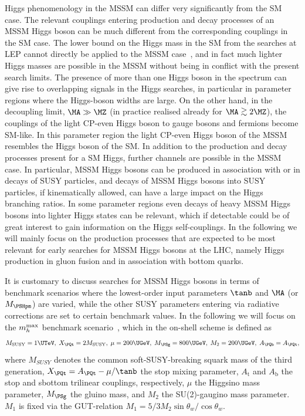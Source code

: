Higgs phenomenology in the MSSM can differ very significantly from the
SM case. The relevant couplings entering production and decay processes
of an MSSM Higgs boson can be much different from the corresponding
couplings in the SM case. The lower bound on the Higgs mass in the SM
from the searches at LEP cannot directly be applied to the MSSM
case~\cite{Barate:2003sz,Schael:2006cr}, and in fact much lighter Higgs 
masses are possible in the MSSM without being in conflict with the
present search limits. The presence of more than one Higgs boson in the
spectrum can give rise to overlapping signals in the Higgs searches, in 
particular in parameter regions where the Higgs-boson widths are large.
On the other hand, 
in the decoupling limit, $\MA \gg \MZ$ (in practice realised already for 
$\MA \gsim 2 \MZ$), the couplings of the light CP-even Higgs boson 
to gauge bosons and fermions become SM-like. In this parameter region 
the light CP-even Higgs boson of the MSSM resembles the 
Higgs boson of the SM. In addition to the production and decay processes 
present for a SM Higgs, further channels are possible in the MSSM case. 
In particular, MSSM Higgs bosons can be produced in association with or
in decays of SUSY particles, and decays of MSSM Higgs bosons into SUSY
particles, if kinematically allowed, can have a large impact on 
the Higgs branching ratios. In some parameter regions even decays of 
heavy MSSM Higgs bosons into lighter Higgs states can be relevant, 
which if detectable could be of great interest to gain information on 
the Higgs self-couplings. In the following we will mainly focus on the 
production processes that are expected to be most relevant for early
searches for MSSM Higgs bosons at the LHC, namely Higgs production in
gluon fusion and in association with bottom quarks.

It is customary to discuss searches for MSSM Higgs bosons in terms of 
benchmark scenarios where the lowest-order input parameters 
$\tanb$ and $\MA$ (or $\MHp$) are varied, while the other SUSY parameters
entering via radiative corrections are set to certain benchmark values. 
In the following we will focus on the $m_h^{\rm max}$ benchmark 
scenario~\cite{Carena:2002qg}, which in the on-shell scheme is defined as
\begin{equation}
M_{\mathrm{SUSY}} = 1 \UTeV, \; X_{\PQt} = 2 M_{\mathrm{SUSY}}, \; \mu = 200 \UGeV, \;
M_{\PSg}=800 \UGeV, \; M_2 = 200 \UGeV, \; A_{\PQb} = A_{\PQt},
\label{YRHXS_MSSM_neutral_eq:mhmax}
\end{equation}
where $M_{SUSY}$ denotes the common soft-SUSY-breaking squark mass of
the third generation, $X_{\PQt}=A_{\PQt}-\mu/\tanb$ the stop mixing
parameter, $A_\mathrm{t}$ and $A_\mathrm{b}$ the stop and sbottom
trilinear couplings, respectively, $\mu$ the Higgsino mass parameter,
$M_{\PSg}$ the gluino mass, and $M_2$ the SU(2)-gaugino mass parameter.
$M_1$ is fixed via the GUT-relation $M_1 = 5/3 M_2 \sin \theta_w/\cos
\theta_w$.

